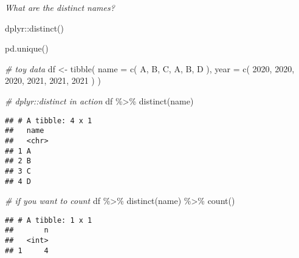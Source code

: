 \documentclass[
]{book}
\newenvironment{Shaded}{\begin{snugshade}}{\end{snugshade}}
\newcommand{\AttributeTok}[1]{\textcolor[rgb]{0.77,0.63,0.00}{#1}}
\newcommand{\CommentTok}[1]{\textcolor[rgb]{0.56,0.35,0.01}{\textit{#1}}}
\newcommand{\DecValTok}[1]{\textcolor[rgb]{0.00,0.00,0.81}{#1}}
\newcommand{\FunctionTok}[1]{\textcolor[rgb]{0.00,0.00,0.00}{#1}}
\newcommand{\NormalTok}[1]{#1}
\newcommand{\OtherTok}[1]{\textcolor[rgb]{0.56,0.35,0.01}{#1}}
\newcommand{\SpecialCharTok}[1]{\textcolor[rgb]{0.00,0.00,0.00}{#1}}
\newcommand{\StringTok}[1]{\textcolor[rgb]{0.31,0.60,0.02}{#1}}
\begin{document}
\emph{What are the distinct names?}

dplyr::distinct()

pd.unique()

\begin{Shaded}
\begin{Highlighting}[]
\CommentTok{\# toy data}
\NormalTok{df }\OtherTok{\textless{}{-}} \FunctionTok{tibble}\NormalTok{(}
    \AttributeTok{name =} \FunctionTok{c}\NormalTok{(}
        \StringTok{\textquotesingle{}A\textquotesingle{}}\NormalTok{, }\StringTok{\textquotesingle{}B\textquotesingle{}}\NormalTok{, }\StringTok{\textquotesingle{}C\textquotesingle{}}\NormalTok{,}
        \StringTok{\textquotesingle{}A\textquotesingle{}}\NormalTok{, }\StringTok{\textquotesingle{}B\textquotesingle{}}\NormalTok{, }\StringTok{\textquotesingle{}D\textquotesingle{}}
\NormalTok{    ),}
    \AttributeTok{year =} \FunctionTok{c}\NormalTok{(}
        \DecValTok{2020}\NormalTok{, }\DecValTok{2020}\NormalTok{, }\DecValTok{2020}\NormalTok{,}
        \DecValTok{2021}\NormalTok{, }\DecValTok{2021}\NormalTok{, }\DecValTok{2021}
\NormalTok{    )}
\NormalTok{)}
\end{Highlighting}
\end{Shaded}

\begin{Shaded}
\begin{Highlighting}[]
\CommentTok{\# dplyr::distinct in action}
\NormalTok{df }\SpecialCharTok{\%\textgreater{}\%} \FunctionTok{distinct}\NormalTok{(name)}
\end{Highlighting}
\end{Shaded}

\begin{verbatim}
## # A tibble: 4 x 1
##   name 
##   <chr>
## 1 A    
## 2 B    
## 3 C    
## 4 D
\end{verbatim}

\begin{Shaded}
\begin{Highlighting}[]
\CommentTok{\# if you want to count}
\NormalTok{df }\SpecialCharTok{\%\textgreater{}\%} \FunctionTok{distinct}\NormalTok{(name) }\SpecialCharTok{\%\textgreater{}\%} \FunctionTok{count}\NormalTok{()}
\end{Highlighting}
\end{Shaded}

\begin{verbatim}
## # A tibble: 1 x 1
##       n
##   <int>
## 1     4
\end{verbatim}
\end{document}
